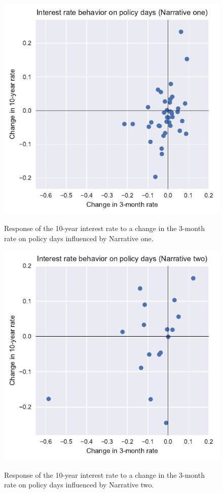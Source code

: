 \documentclass[11pt,a4paper,english,oneside]{book}
\numberwithin{equation}{chapter}
\begin{document}
\begin{figure}
	\caption{Response of the 10-year interest rate to a change in the 3-month rate on policy days influenced by Narrative one.}
	\centering
	\includegraphics[scale=1]{Images/ChangePlot02.pdf}
	\label{Change02}
\end{figure}

\begin{figure}
	\caption{Response of the 10-year interest rate to a change in the 3-month rate on policy days influenced by Narrative two.}
	\centering
	\includegraphics[scale=1]{Images/ChangePlot03.pdf}
	\label{Change03}
\end{figure}
\end{document}
